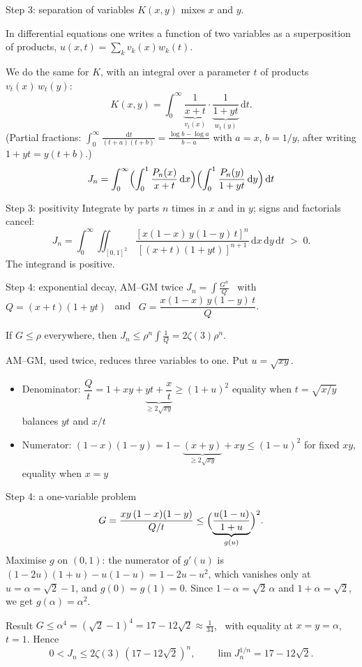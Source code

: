 \documentclass[aspectratio=169,11pt]{beamer}
\newcommand{\dd}{\,\mathrm{d}}
\begin{document}
\begin{frame}{Step 3: separation of variables}
  $K(x,y)$ mixes $x$ and $y$.
  \medskip

  In differential equations one writes a function of two variables as a
  superposition of products, $u(x,t)=\sum_kv_k(x)w_k(t)$.

  We do the same for $K$, with an integral over a parameter $t$ of products $v_t(x)\,w_t(y)$:
  \[
    K(x,y)=\int_0^\infty\underbrace{\frac1{x+t}}_{v_t(x)}\cdot\underbrace{\frac1{1+yt}}_{w_t(y)}\dd t .
  \]
  {\footnotesize (Partial fractions: $\int_0^\infty\frac{\dd t}{(t+a)(t+b)}=\frac{\log b-\log a}{b-a}$ with $a=x$, $b=1/y$, after writing $1+yt=y(t+b)$.)}
  \[
    J_n=\int_0^\infty\Bigl(\int_0^1\frac{P_n(x)}{x+t}\dd x\Bigr)\Bigl(\int_0^1\frac{P_n(y)}{1+yt}\dd y\Bigr)\dd t
  \]
\end{frame}

\begin{frame}{Step 3: positivity}
  Integrate by parts $n$ times in $x$ and in $y$; signs and factorials cancel:
  \[
    J_n=\int_0^\infty\!\!\iint_{[0,1]^2}
    \frac{[x(1-x)\,y(1-y)\,t]^n}{[(x+t)(1+yt)]^{n+1}}\dd x\dd y\dd t\;>\;0.
  \]
  The integrand is positive.
\end{frame}

\begin{frame}{Step 4: exponential decay, AM--GM twice}
  $J_n=\displaystyle\int\frac{G^n}{Q}$ \ with \ $Q=(x+t)(1+yt)$ \ and \ $G=\dfrac{x(1-x)\,y(1-y)\,t}{Q}$.
  \medskip

  If $G\le\rho$ everywhere, then $J_n\le\rho^n\displaystyle\int\frac1Q=2\zeta(3)\rho^n$.
  \medskip

  AM--GM, used twice, reduces three variables to one. Put $u=\sqrt{xy}$.
  \begin{itemize}
    \item Denominator: $\dfrac Qt=1+xy+\underbrace{yt+\dfrac xt}_{\ge2\sqrt{xy}}\ge(1+u)^2$
      \newline\mbox{}\hfill{\small equality when $t=\sqrt{x/y}$ balances $yt$ and $x/t$}
    \item Numerator: $(1-x)(1-y)=1-\underbrace{(x+y)}_{\ge2\sqrt{xy}}+xy\le(1-u)^2$
      \newline\mbox{}\hfill{\small for fixed $xy$, equality when $x=y$}
  \end{itemize}
\end{frame}

\begin{frame}{Step 4: a one-variable problem}
  \[
    G=\frac{xy\,(1-x)(1-y)}{Q/t}\le\Bigl(\underbrace{\frac{u(1-u)}{1+u}}_{g(u)}\Bigr)^2 .
  \]
  Maximise $g$ on $(0,1)$: the numerator of $g'(u)$ is $(1-2u)(1+u)-u(1-u)=1-2u-u^2$, which
  vanishes only at $u=\alpha=\sqrt2-1$, and $g(0)=g(1)=0$. Since $1-\alpha=\sqrt2\,\alpha$ and $1+\alpha=\sqrt2$, we get $g(\alpha)=\alpha^2$.
  \begin{block}{Result}
    $G\le\alpha^4=(\sqrt2-1)^4=17-12\sqrt2\approx\frac1{34}$, \ with equality at $x=y=\alpha$, $t=1$. Hence
    \[
      0<J_n\le2\zeta(3)\,(17-12\sqrt2)^n,\qquad\lim J_n^{1/n}=17-12\sqrt2.
    \]
  \end{block}
\end{frame}
\end{document}
